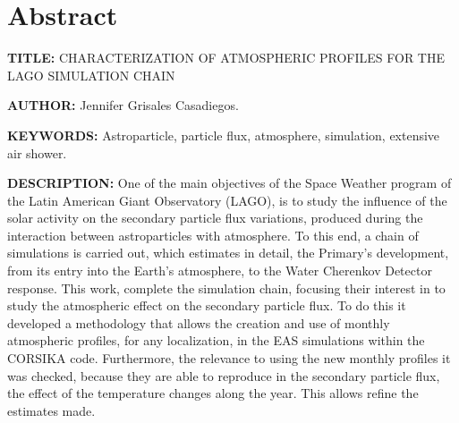 \newpage
\chapter*{Abstract}
\label{sec:abst}
\footnotesize{
\noindent\textbf{TITLE:} CHARACTERIZATION OF ATMOSPHERIC PROFILES FOR THE LAGO SIMULATION CHAIN

\noindent\textbf{AUTHOR:} Jennifer Grisales Casadiegos.

\noindent\textbf{KEYWORDS: } Astroparticle, particle flux, atmosphere, simulation, extensive air shower.

\noindent\textbf{DESCRIPTION:} One of the main objectives of the Space Weather program of the Latin American Giant Observatory (LAGO), is to study the influence of the solar activity on the secondary particle flux  variations, produced during the interaction between astroparticles with atmosphere. To this end, a chain of simulations is carried out, which estimates in detail, the Primary's development, from its entry into the Earth's atmosphere, to the Water Cherenkov Detector response. This work, complete the simulation chain, focusing their interest in to study the atmospheric effect on the secondary particle flux. To do this it developed a methodology that allows the creation and use of monthly atmospheric profiles, for any localization, in the EAS simulations within the CORSIKA code. Furthermore, the relevance to using the new monthly profiles it was checked, because they are able to reproduce in the secondary particle flux, the effect of the temperature changes along the year. This allows refine the estimates made.
}\normalsize
\clearpage